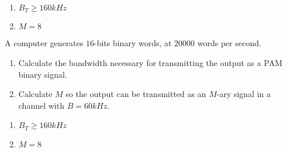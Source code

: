 \documentclass[es,boletin]{uah}
\begin{document}
{	
\begin{enumerate}
	\item $B_T \geq 160kHz$
	\item $M=8$
\end{enumerate}
}
{
\cite{Carlson} A computer generates $16$-bits binary words, at $20000$ words per second. 

\begin{enumerate}
	\item Calculate the bandwidth necessary for transmitting the output as a PAM binary signal.
	\item Calculate $M$ so the output can be transmitted as an $M$-ary signal in a channel with $B=60 kHz$.
\end{enumerate}
}
{
\begin{enumerate}
	\item $B_T \geq 160kHz$
	\item $M=8$
\end{enumerate}
}
\end{document}
